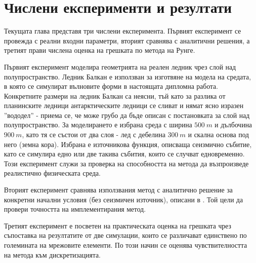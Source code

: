 \documentclass{report}
\begin{document}
	
	\chapter{Числени експерименти и резултати}
	Текущата глава представя три числени експеримента. Първият експеримент се провежда с реални входни параметри, вторият сравнява с аналитични решения, а третият прави числена оценка на грешката по метода на Рунге. 
	
	Първият експеримент моделира геометрията на реален ледник чрез слой над полупространство. 	Ледник Балкан е използван за изготвяне на модела на средата, в която се симулират вълновите форми в настоящата дипломна работа. Конкретните размери на ледник Балкан са неясни, тъй като за разлика от планинските ледници антарктическите ледници се сливат и нямат ясно изразен ''вододел'' - приема се, че може грубо да бъде описан с постановката за слой над полупространство. За моделирането е избрана среда с ширина $500~m$ и дълбочина $900~m$, като тя се състои от два слоя - лед с дебелина $300~m$ и скална основа под него (земна кора). Избрана е източникова функция, описваща сеизмично събитие, като се симулира едно или две такива събития, които се случват едновременно. Този експеримент служи за проверка на способността на метода да възпроизведе реалистично физическата среда.
	
	Вторият експеримент сравнява използвания метод с аналитично решение за конкретни начални условия (без сеизмичен източник), описани в \cite{walters2020analytic}. Той цели да провери точността на имплементирания метод.
	
	Третият експеримент е посветен на практическата оценка на грешката чрез съпоставка на резултатите от две симулации, които се различават единствено по големината на мрежовите елементи. По този начин се оценява чувствителността на метода към дискретизацията.
	
\end{document}
